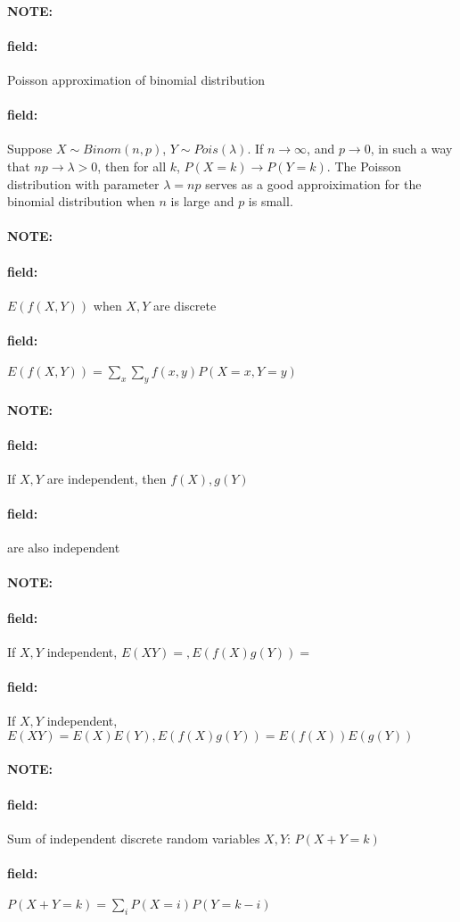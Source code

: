 \documentclass[12pt]{article}
\newenvironment{note}{\paragraph{NOTE:}}{}
\newenvironment{field}{\paragraph{field:}}{}
\begin{document}
\begin{note}
  \begin{field}
    Poisson approximation of binomial distribution
  \end{field}
  \begin{field}
    Suppose $X \sim Binom(n,p)$, $Y \sim Pois (\lambda)$. If $n\to \infty$, and $p \to 0$, in such a way that $np \to \lambda > 0$, then for all $k$, $P(X = k) \to P(Y = k)$. The Poisson distribution with parameter $\lambda = np$ serves as a good approiximation for the binomial distribution when $n$ is large and $p$ is small.
  \end{field}
\end{note}



\begin{note}
  \begin{field}
    $E(f(X,Y))$ when $X,Y$ are discrete
  \end{field}
  \begin{field}
    $E(f(X,Y)) = \sum_x \sum_y f(x,y)P(X=x,Y=y)$
  \end{field}
\end{note}


\begin{note}
  \begin{field}
    If $X,Y$ are independent, then $f(X),g(Y)$
  \end{field}
  \begin{field}
    are also independent
  \end{field}
\end{note}

\begin{note}
  \begin{field}
    If $X,Y$ independent, $E(XY) = , E(f(X)g(Y)) = $
  \end{field}
  \begin{field}
    If $X,Y$ independent, $E(XY) = E(X)E(Y), E(f(X)g(Y)) = E(f(X))E(g(Y))$
  \end{field}
\end{note}

\begin{note}
  \begin{field}
    Sum of independent discrete random variables $X,Y$: $P(X+Y = k)$
  \end{field}
  \begin{field}
    $P(X+Y = k) = \sum_i P(X=i)P(Y=k-i)$
  \end{field}
\end{note}
\end{document}
